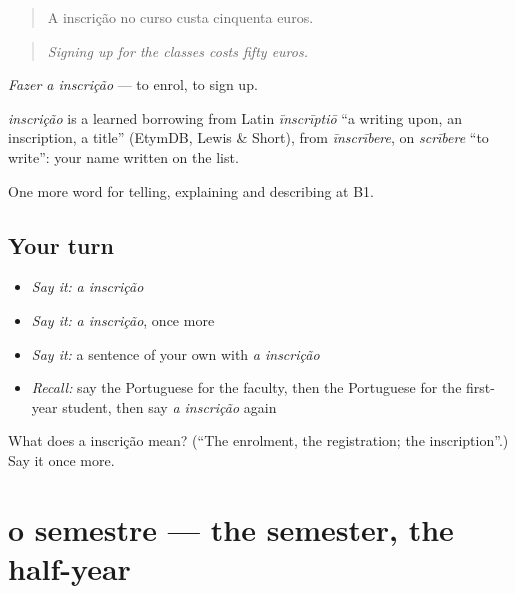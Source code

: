 \begin{quote}
A inscrição no curso custa cinquenta euros.
\end{quote}

\begin{quote}
\emph{Signing up for the classes costs fifty euros.}
\end{quote}

\emph{Fazer a inscrição} — to enrol, to sign up.

\begin{cousinweb}
\emph{inscrição} is a learned borrowing from Latin \emph{īnscrīptiō} \textquotedblleft{}a writing upon, an inscription, a title\textquotedblright{} (EtymDB, Lewis \& Short), from \emph{īnscrībere}, on \emph{scrībere} \textquotedblleft{}to write\textquotedblright{}: your name written on the list.
\end{cousinweb}

\begin{grammarlens}[title={What you've built}]
One more word for telling, explaining and describing at B1.
\end{grammarlens}

\subsection*{Your turn}
\begin{itemize}
\raggedright
  \item \emph{Say it:} \emph{a inscrição}
  \item \emph{Say it:} \emph{a inscrição}, once more
  \item \emph{Say it:} a sentence of your own with \emph{a inscrição}
  \item \emph{Recall:} say the Portuguese for the faculty, then the Portuguese for the first-year student, then say \emph{a inscrição} again
\end{itemize}

\begin{tcolorbox}[breakable,colback=teal!4,colframe=teal!35!black,title={Before you move on}]
What does a inscrição mean? (\textquotedblleft{}The enrolment, the registration; the inscription\textquotedblright{}.) Say it once more.
\end{tcolorbox}
\section[o semestre]{o semestre — the semester, the half-year}

\label{lesson:PT-C376-semestre}



